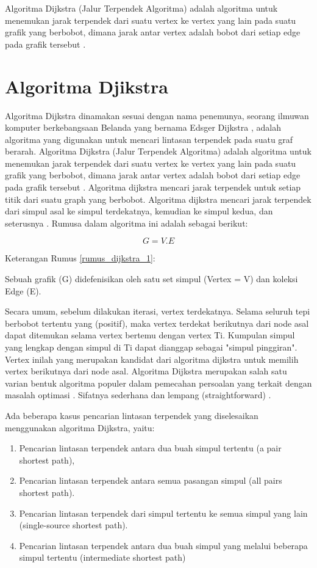 Algoritma Dijkstra (Jalur Terpendek Algoritma) adalah algoritma untuk menemukan jarak terpendek dari suatu vertex ke vertex yang lain pada suatu grafik yang berbobot, dimana jarak antar vertex adalah bobot dari setiap edge pada grafik tersebut \cite{salman2019minimum}.

\section{Algoritma Djikstra}
\label{Algoritma_Djikstra_Teori}
Algoritma Dijkstra dinamakan sesuai dengan nama penemunya, seorang ilmuwan komputer berkebangsaan Belanda yang bernama Edsger Dijkstra \cite{williams2019crusader}, adalah algoritma yang digunakan untuk mencari lintasan terpendek pada suatu graf berarah. Algoritma Dijkstra (Jalur Terpendek Algoritma) adalah algoritma untuk menemukan jarak terpendek dari suatu vertex ke vertex yang lain pada suatu grafik yang berbobot, dimana jarak antar vertex adalah bobot dari setiap edge pada grafik tersebut \cite{salman2019minimum}. Algoritma dijkstra mencari jarak terpendek untuk setiap titik dari suatu graph yang berbobot. Algoritma dijkstra mencari jarak terpendek dari simpul asal ke simpul terdekatnya, kemudian ke simpul kedua, dan seterusnya \cite{ghanbartehrani2019efficient}. Rumusa dalam algoritma ini adalah sebagai berikut:

\begin{equation}
\label{rumus_dijkstra_1}
    G = {V. E}
\end{equation}
\par Keterangan Rumus \ref{rumus_dijkstra_1}:
\par Sebuah grafik (G) didefenisikan oleh satu set simpul (Vertex = V) dan koleksi Edge (E).

Secara umum, sebelum dilakukan iterasi, vertex terdekatnya. Selama seluruh tepi berbobot tertentu yang (positif), maka vertex terdekat berikutnya dari node asal dapat ditemukan selama vertex bertemu dengan vertex Ti.
Kumpulan simpul yang lengkap dengan simpul di Ti dapat dianggap sebagai "simpul pinggiran". Vertex inilah yang merupakan kandidat dari algoritma dijkstra untuk memilih vertex berikutnya dari node asal. Algoritma Dijkstra merupakan salah satu varian bentuk algoritma populer dalam pemecahan persoalan yang terkait dengan masalah optimasi \cite{hellwig2019optimization}. Sifatnya sederhana dan lempang (straightforward) \cite{hidayat2019sistem}.

Ada beberapa kasus pencarian lintasan terpendek yang
diselesaikan menggunakan algoritma Dijkstra, yaitu:
\begin{enumerate}
    \item Pencarian lintasan terpendek antara dua buah simpul
tertentu (a pair shortest path),
    \item Pencarian lintasan terpendek antara semua pasangan
simpul (all pairs shortest path).
    \item Pencarian lintasan terpendek dari simpul tertentu ke
semua simpul yang lain (single-source shortest path).
    \item Pencarian lintasan terpendek antara dua buah simpul
yang melalui beberapa simpul tertentu (intermediate
shortest path)
\end{enumerate}


